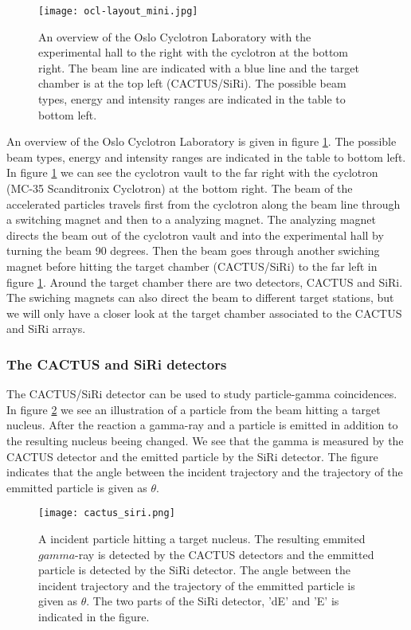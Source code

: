 \documentclass[11pt,a4wide]{article}
\begin{document}
\begin{figure}[htp]
\centering
\texttt{[image: ocl-layout\_mini.jpg]}
\caption{An overview of the Oslo Cyclotron Laboratory with the experimental hall to the right with the cyclotron at the bottom right. The beam line are indicated with a blue line and the target chamber is at the top left (CACTUS/SiRi). The possible beam types, energy and intensity ranges are indicated in the table to bottom left. }
\label{fig:OLC_exp_hall}
\end{figure}

An overview of the Oslo Cyclotron Laboratory is given in figure \ref{fig:OLC_exp_hall}. The possible beam types, energy and intensity ranges are indicated in the table to bottom left. In figure \ref{fig:OLC_exp_hall} we can see the cyclotron vault to the far right with the cyclotron (MC-35 Scanditronix Cyclotron) at the bottom right. The beam of the accelerated particles travels first from the cyclotron along the beam line through a switching magnet and then to a analyzing magnet. The analyzing magnet directs the beam out of the cyclotron vault and into the experimental hall by turning the beam 90 degrees. Then the beam goes through another swiching magnet before hitting the target chamber (CACTUS/SiRi) to the far left in figure \ref{fig:OLC_exp_hall}. Around the target chamber there are two detectors, CACTUS and SiRi. The swiching magnets can also direct the beam to different target stations, but we will only have a closer look at the target chamber associated to the CACTUS and SiRi arrays. 


\subsubsection{The CACTUS and SiRi detectors}
The CACTUS/SiRi detector can be used to study particle-gamma coincidences. In figure \ref{fig: cactus_siri} we see an illustration of a particle from the beam hitting a target nucleus. After the reaction a gamma-ray and a particle is emitted in addition to the resulting nucleus beeing changed. We see that the gamma is measured by the CACTUS detector and the emitted particle by the SiRi detector. The figure indicates that the angle between the incident trajectory and the trajectory of the emmitted particle is given as $\theta$.
\begin{figure}[htp]
\centering
\texttt{[image: cactus\_siri.png]}
\caption{A incident particle hitting a target nucleus. The resulting emmited $gamma$-ray is detected by the CACTUS detectors and the emmitted particle is detected by the SiRi detector. The angle between the incident trajectory and the trajectory of the emmitted particle is given as $\theta$. The two parts of the SiRi detector, 'dE' and 'E' is indicated in the figure.}
\label{fig: cactus_siri}
\end{figure}
\end{document}

